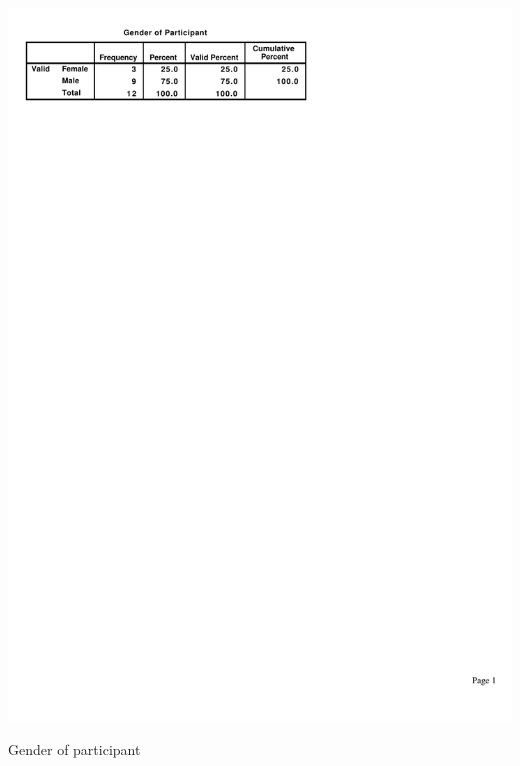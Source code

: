 \documentclass[11pt,openright,a4paper]{report}
\begin{document}
\begin{table}[ht]
\centerline{\includegraphics{figures/Gender.pdf}}
\caption{Gender of participant}
\label{fig:partic_gender}
\end{table}
\end{document}
